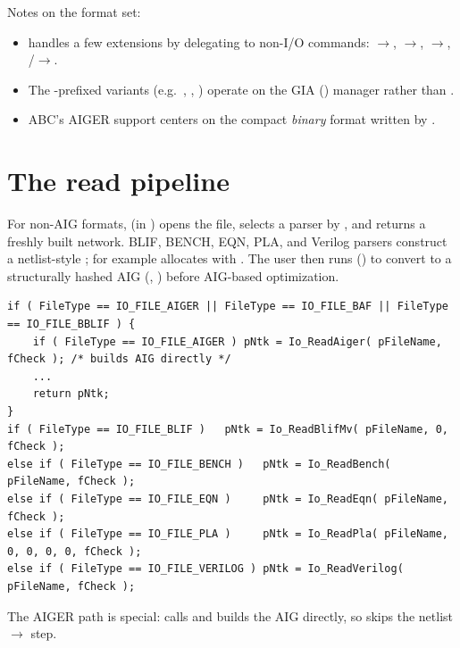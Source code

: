 \noindent Notes on the format set:
\begin{itemize}
  \item {} handles a few extensions by delegating to non-I/O commands:
        $\rightarrow$, $\rightarrow$,
        $\rightarrow$, /$\rightarrow$.
  \item The \cmd{\&}-prefixed variants (e.g.\ , ,
        ) operate on the GIA () manager rather
        than .
  \item ABC's AIGER support centers on the compact \emph{binary} 
        format written by .
\end{itemize}

\section{The read pipeline}

For non-AIG formats,  (in ) opens the
file, selects a parser by , and returns a freshly built
network. BLIF, BENCH, EQN, PLA, and Verilog parsers construct a netlist-style
; for example  allocates
 with . The user then runs 
() to convert to a structurally hashed AIG (,
) before AIG-based optimization.

\begin{lstlisting}[style=abccode,caption={Parser selection in \id{Io\_ReadNetlist} (\file{src/base/io/ioUtil.c}).}]
if ( FileType == IO_FILE_AIGER || FileType == IO_FILE_BAF || FileType == IO_FILE_BBLIF ) {
    if ( FileType == IO_FILE_AIGER ) pNtk = Io_ReadAiger( pFileName, fCheck ); /* builds AIG directly */
    ...
    return pNtk;
}
if ( FileType == IO_FILE_BLIF )   pNtk = Io_ReadBlifMv( pFileName, 0, fCheck );
else if ( FileType == IO_FILE_BENCH )   pNtk = Io_ReadBench( pFileName, fCheck );
else if ( FileType == IO_FILE_EQN )     pNtk = Io_ReadEqn( pFileName, fCheck );
else if ( FileType == IO_FILE_PLA )     pNtk = Io_ReadPla( pFileName, 0, 0, 0, 0, fCheck );
else if ( FileType == IO_FILE_VERILOG ) pNtk = Io_ReadVerilog( pFileName, fCheck );
\end{lstlisting}

\noindent The AIGER path is special:  calls
 and builds the AIG directly,
so  skips the netlist$\rightarrow$ step.


